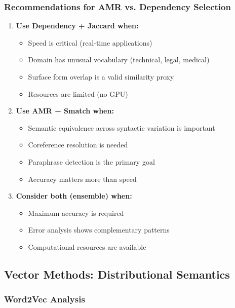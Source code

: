 \documentclass[11pt,a4paper]{article}
\begin{document}
\subsubsection{Recommendations for AMR vs. Dependency Selection}

\begin{enumerate}
    \item \textbf{Use Dependency + Jaccard when:}
    \begin{itemize}
        \item Speed is critical (real-time applications)
        \item Domain has unusual vocabulary (technical, legal, medical)
        \item Surface form overlap is a valid similarity proxy
        \item Resources are limited (no GPU)
    \end{itemize}
    
    \item \textbf{Use AMR + Smatch when:}
    \begin{itemize}
        \item Semantic equivalence across syntactic variation is important
        \item Coreference resolution is needed
        \item Paraphrase detection is the primary goal
        \item Accuracy matters more than speed
    \end{itemize}
    
    \item \textbf{Consider both (ensemble) when:}
    \begin{itemize}
        \item Maximum accuracy is required
        \item Error analysis shows complementary patterns
        \item Computational resources are available
    \end{itemize}
\end{enumerate}

\subsection{Vector Methods: Distributional Semantics}

\subsubsection{Word2Vec Analysis}
\end{document}
